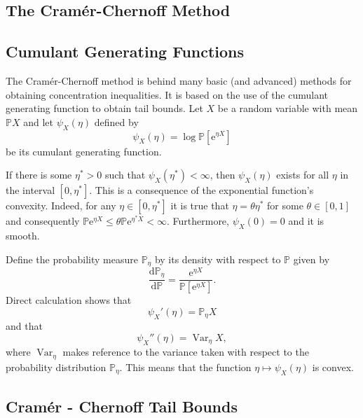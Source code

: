 \documentclass{uvamath}
\newcommand*{\bbP}{\mathbb{P}}
\newcommand*{\rme}{\mathrm{e}}
\newcommand*{\rmd}{\mathrm{d}}
\DeclareMathOperator{\var}{Var}
\theoremstyle{remark}
\theoremstyle{definition}
\theoremstyle{definition}
\theoremstyle{definition}
\theoremstyle{definition}
\theoremstyle{definition}
\begin{document}
\begin{appendices}
\chapter{The Cramér-Chernoff Method \label{app:cramer_chernoff}}

\section{Cumulant Generating Functions}
The Cramér-Chernoff method is behind many basic (and advanced) methods
for obtaining concentration inequalities. It is based on the use of
the cumulant generating function to obtain tail bounds. Let $X$ be a
random variable with mean $\bbP X$ and let $\psi_{X}(\eta)$ defined by
\begin{equation*}
  \psi_{X}(\eta) = \log\bbP[\rme^{\eta X}]
\end{equation*}
be its cumulant generating function.

If there is some $\eta^*>0$ such that $\psi_X(\eta^*)<\infty$, then
$\psi_X(\eta)$ exists for all $\eta$ in the interval $[0, \eta^*]$.
This is a consequence of the exponential function's convexity. Indeed,
for any $\eta\in[0,\eta^*]$ it is true that $\eta = \theta\eta^*$ for
some $\theta\in [0,1]$ and consequently
$\bbP\rme^{\eta X}\leq \theta \bbP\rme^{\eta^*
  X}<\infty$.
Furthermore, $\psi_X(0) = 0$ and it is smooth.

Define the probability measure $\bbP_\eta$ by its density with respect
to $\bbP$ given by
\begin{equation*}
  \frac{\rmd\bbP_\eta}{\rmd\bbP} = \frac{\rme^{\eta
      X}}{\bbP[\rme^{\eta X}]}.
\end{equation*}
Direct calculation shows that
\begin{equation*}
  \psi_X'(\eta) = \bbP_\eta X
\end{equation*}
and that
\begin{equation*}
  \psi_X''(\eta) = \var_\eta X,
\end{equation*}
where $\var_{\eta}$ makes reference to the variance taken with respect
to the probability distribution $\bbP_\eta$. This means that the
function $\eta\mapsto \psi_X(\eta)$ is convex.

\section{Cramér - Chernoff Tail Bounds}


\end{appendices}
\end{document}
